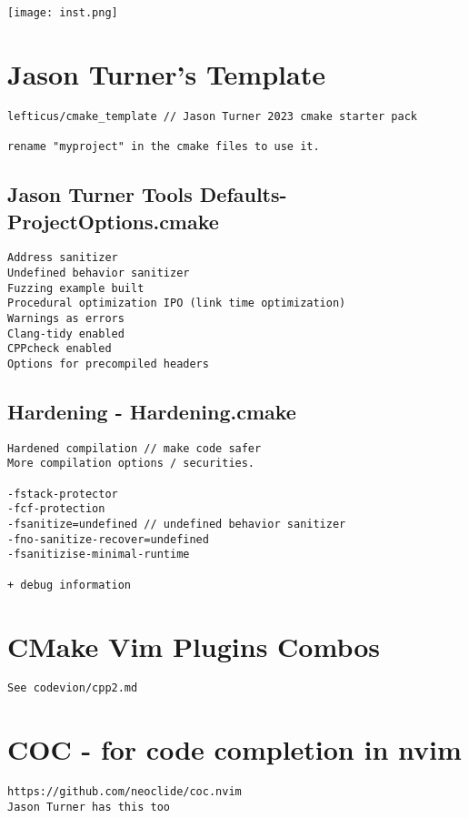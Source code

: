 \documentclass[openany]{report}
\begin{document}
\begin{center}
    \texttt{[image: inst.png]}
\end{center}


\section{Jason Turner's Template}

\begin{verbatim}
lefticus/cmake_template // Jason Turner 2023 cmake starter pack

rename "myproject" in the cmake files to use it.

\end{verbatim}

\subsection{Jason Turner Tools Defaults- ProjectOptions.cmake}

\begin{verbatim}
Address sanitizer
Undefined behavior sanitizer
Fuzzing example built
Procedural optimization IPO (link time optimization)
Warnings as errors
Clang-tidy enabled
CPPcheck enabled
Options for precompiled headers
\end{verbatim}

\subsection{Hardening - Hardening.cmake}

\begin{verbatim}
Hardened compilation // make code safer
More compilation options / securities.

-fstack-protector
-fcf-protection
-fsanitize=undefined // undefined behavior sanitizer
-fno-sanitize-recover=undefined
-fsanitizise-minimal-runtime

+ debug information 
\end{verbatim}


\section{CMake Vim Plugins Combos}

\begin{verbatim}
See codevion/cpp2.md
\end{verbatim}

\section{COC - for code completion in nvim}
\begin{verbatim}
https://github.com/neoclide/coc.nvim
Jason Turner has this too
\end{verbatim}
\end{document}
